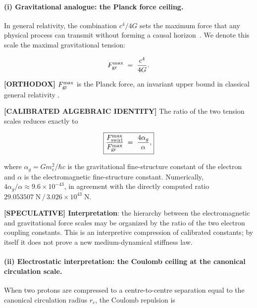 \documentclass[11pt]{article}
\theoremstyle{definition}
\theoremstyle{plain}
\theoremstyle{remark}
\newcommand{\rc}{{r_c}}
\begin{document}
        \paragraph{(i) Gravitational analogue: the Planck force ceiling.}

        In general relativity, the combination $c^4/4G$ sets the maximum force that any physical process can transmit without forming a causal horizon~\cite{Gibbons2002}. We denote this scale the maximal gravitational tension:

        \begin{align}
            F_{\rm gr}^{\max} \;=\; \frac{c^4}{4G}.
            \label{eq:Fgr}
        \end{align}

        \textbf{[ORTHODOX]} $F_{\rm gr}^{\max}$ is the Planck force, an invariant upper bound in classical general relativity \cite{Gibbons2002}.

        \textbf{[CALIBRATED ALGEBRAIC IDENTITY]} The ratio of the two tension scales reduces exactly to

        \begin{align}
            \boxed{
            \frac{F_{\rm swirl}^{\max}}{F_{\rm gr}^{\max}}
            \;=\; \frac{4\alpha_g}{\alpha},
            }
            \label{eq:Fmax_ratio}
        \end{align}

        where $\alpha_g = Gm_e^2/\hbar c$ is the gravitational fine-structure constant of the electron and $\alpha$ is the electromagnetic fine-structure constant. Numerically, $4\alpha_g/\alpha \approx 9.6\times10^{-43}$, in agreement with the directly computed ratio $29.053507\;\text{N}\,/\,3.026\times10^{43}\;\text{N}$.

        \textbf{[SPECULATIVE] Interpretation}: the hierarchy between the electromagnetic and gravitational force scales may be organized by the ratio of the two electron coupling constants. This is an interpretive compression of calibrated constants; by itself it does not prove a new medium-dynamical stiffness law.

        \paragraph{(ii) Electrostatic interpretation: the Coulomb ceiling at the canonical circulation scale.}

        When two protons are compressed to a centre-to-centre separation equal to the canonical circulation radius $\rc$, the Coulomb repulsion is
\end{document}
